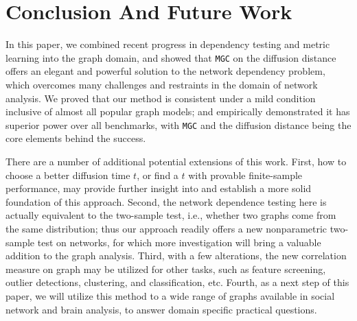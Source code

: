 \documentclass[11pt]{article}
\theoremstyle{definition}
\begin{document}
\vspace*{-0.5cm}
\section{Conclusion And Future Work}
\label{sec:conc}
	\vspace*{-0.2cm}
In this paper, we combined recent progress in dependency testing and metric learning into the graph domain, and showed that \texttt{MGC} on the diffusion distance offers an elegant and powerful solution to the network dependency problem, which overcomes many challenges and restraints in the domain of network analysis. We proved that our method is consistent under a mild condition inclusive of almost all popular graph models; and empirically demonstrated it has superior power over all benchmarks, with \texttt{MGC} and the diffusion distance being the core elements behind the success.

There are a number of additional potential extensions of this work. First, how to choose a better diffusion time $t$, or find a $t$ with provable finite-sample performance, may provide further insight into and establish a more solid foundation of this approach. Second, the network dependence testing here is actually equivalent to the two-sample test, i.e., whether two graphs come from the same distribution; thus our approach readily offers a new nonparametric two-sample test on networks, for which more investigation will bring a valuable addition to the graph analysis. Third, with a few alterations, the new correlation measure on graph may be utilized for other tasks, such as feature screening, outlier detections, clustering, and classification, etc. Fourth, as a next step of this paper, we will utilize this method to a wide range of graphs available in social network and brain analysis, to answer domain specific practical questions.

\end{document}
